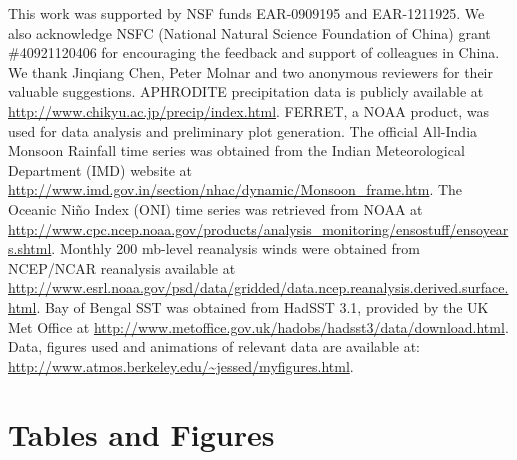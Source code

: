 	This work was supported by NSF funds EAR-0909195 and EAR-1211925. We also acknowledge NSFC (National Natural Science Foundation of China) grant \#40921120406 for encouraging the feedback and support of colleagues in China. We thank Jinqiang Chen, Peter Molnar and two anonymous reviewers for their valuable suggestions. APHRODITE precipitation data is publicly available at \url{http://www.chikyu.ac.jp/precip/index.html}. FERRET, a NOAA product, was used for data analysis and preliminary plot generation. The official All-India Monsoon Rainfall time series was obtained from the Indian Meteorological Department (IMD) website at \url{http://www.imd.gov.in/section/nhac/dynamic/Monsoon_frame.htm}. The Oceanic Ni\~no Index (ONI) time series was retrieved from NOAA at \url{http://www.cpc.ncep.noaa.gov/products/analysis_monitoring/ensostuff/ensoyears.shtml}. Monthly 200 mb-level reanalysis winds were obtained from NCEP/NCAR reanalysis available at \url{http://www.esrl.noaa.gov/psd/data/gridded/data.ncep.reanalysis.derived.surface.html}. Bay of Bengal SST was obtained from HadSST 3.1, provided by the UK Met Office at \url{http://www.metoffice.gov.uk/hadobs/hadsst3/data/download.html}. Data, figures used and animations of relevant data are available at: \url{http://www.atmos.berkeley.edu/~jessed/myfigures.html}.
	
\newpage	
\section{Tables and Figures}
\clearpage	

